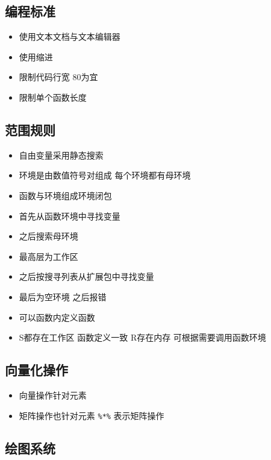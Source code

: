 \documentclass[
]{book}
\providecommand{\tightlist}{%
  \setlength{\itemsep}{0pt}\setlength{\parskip}{0pt}}
\begin{document}
\hypertarget{ux7f16ux7a0bux6807ux51c6}{%
\subsection{编程标准}\label{ux7f16ux7a0bux6807ux51c6}}

\begin{itemize}
\tightlist
\item
  使用文本文档与文本编辑器
\item
  使用缩进
\item
  限制代码行宽 80为宜
\item
  限制单个函数长度
\end{itemize}

\hypertarget{ux8303ux56f4ux89c4ux5219}{%
\subsection{范围规则}\label{ux8303ux56f4ux89c4ux5219}}

\begin{itemize}
\tightlist
\item
  自由变量采用静态搜索
\item
  环境是由数值符号对组成 每个环境都有母环境
\item
  函数与环境组成环境闭包
\item
  首先从函数环境中寻找变量
\item
  之后搜索母环境
\item
  最高层为工作区
\item
  之后按搜寻列表从扩展包中寻找变量
\item
  最后为空环境 之后报错
\item
  可以函数内定义函数
\item
  S都存在工作区 函数定义一致 R存在内存 可根据需要调用函数环境
\end{itemize}

\hypertarget{ux5411ux91cfux5316ux64cdux4f5c}{%
\subsection{向量化操作}\label{ux5411ux91cfux5316ux64cdux4f5c}}

\begin{itemize}
\tightlist
\item
  向量操作针对元素
\item
  矩阵操作也针对元素 \texttt{\%*\%} 表示矩阵操作
\end{itemize}

\hypertarget{ux7ed8ux56feux7cfbux7edf}{%
\subsection{绘图系统}\label{ux7ed8ux56feux7cfbux7edf}}
\end{document}
